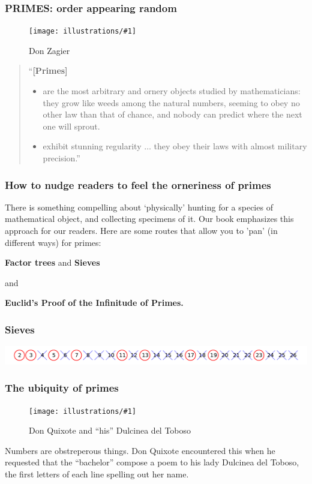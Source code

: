 \documentclass{beamer}
\newcommand{\ill}[3]{%
   \begin{figure}[H]%
   \vspace{-2ex}
   \centering%
   \texttt{[image: illustrations/\#1]}%
   \caption{#3}%
   \vspace{-2ex}
    \end{figure}}
\newcommand{\illtwo}[4]{%
   \begin{figure}[H]\centering%
   \texttt{[image: illustrations/\#1]}$\qquad$\texttt{[image: illustrations/\#2]}%
   \caption{#4}%
    \end{figure}}
\begin{document}
\begin{frame}\frametitle{PRIMES: order appearing random }
\vskip10pt
\ill{zagier}{.15}{Don Zagier}


\begin{quote}

``{\bf [Primes]}
\begin{itemize}\item are the most arbitrary and ornery objects studied by mathematicians:
  they grow like weeds among the natural numbers, seeming to obey no
  other law than that of chance, and nobody can predict where the next
  one will sprout. \item  exhibit stunning
  regularity $\dots$
  they obey their laws with almost military precision.''\end{itemize}
\end{quote}
\end{frame}

\begin{frame}\frametitle{How to nudge readers to feel the orneriness of primes }

 There is something compelling about `physically' hunting for a species of  mathematical object, and collecting specimens of it. Our book emphasizes this approach for our readers. Here are some routes that allow you to 'pan' (in different ways)  for  primes:

\vskip20pt


\centerline{ {\bf Factor trees}  and {\bf Sieves}}


\vskip10pt


\centerline{and}


\vskip10pt


\centerline{\bf Euclid's Proof of the Infinitude of Primes.}
\end{frame}


\begin{frame}\frametitle{\bf Sieves}
\includegraphics[width=\textwidth]{illustrations/circled_primes}
\end{frame}

\begin{frame}\frametitle{\bf The ubiquity of primes}
\vskip10pt
\ill{dulcinea1}{.2}{Don Quixote and ``his'' Dulcinea del Toboso}
\vskip10pt
Numbers are obstreperous things. Don Quixote encountered this when he
requested that the ``bachelor'' compose a poem to his lady Dulcinea del
Toboso, the first letters of each line spelling out her name.
\end{frame}
\end{document}
